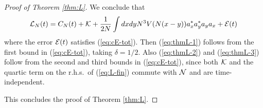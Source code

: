 \documentclass[11pt,a4paper]{article}
\newcommand{\cE}{{\cal E}}
\newcommand{\cK}{{\cal K}}
\newcommand{\cH}{{\cal H}}
\newcommand{\cL}{{\cal L}}
\newcommand{\cN}{{\cal N}}
\begin{document}
\begin{proof}[Proof of Theorem \ref{thm:L}]
We conclude that
\begin{equation}\label{eq:L-fin} \cL_N (t) = C_N (t) + \cK  + \frac{1}{2N}  \int dx dy N^3 V (N (x-y)) a_x^* a_y^* a_y a_x + \cE (t) \end{equation}
where the error $\cE (t)$ satisfies (\ref{eq:cE-tot}). Then (\ref{eq:thmL-1}) follows from the first bound in (\ref{eq:cE-tot}), taking $\delta = 1/2$. Also (\ref{eq:thmL-2}) and (\ref{eq:thmL-3}) follow from the second and third bounds in (\ref{eq:cE-tot}), since both $\cK$ and the quartic term on the r.h.s.\ of (\ref{eq:L-fin}) commute with $\cN$ and are time-independent. 

This concludes the proof of Theorem \ref{thm:L}.
\end{proof}


\end{document}
